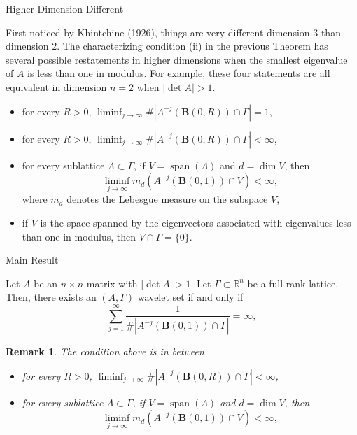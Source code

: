 \documentclass{sintefbeamer}
\newcommand{\R}{{\mathbb {R}}}
\newtheorem{remark}{Remark}
\begin{document}
\begin{frame}{Higher Dimension Different}

   First noticed by Khintchine (1926), things are very different dimension 3 than dimension 2. The characterizing condition (ii) in the previous Theorem has several possible restatements in higher dimensions when the smallest eigenvalue of $A$ is less than one in modulus. For example, these four statements are all equivalent in dimension $n=2$ when $\left|\det A\right|>1$.
   
    \begin{itemize}
\item for every $R > 0$, $\liminf_{j \to \infty} \# | A^{-j}(\mathbf B(0,R)) \cap \Gamma | = 1$,
\pause \item for every $R > 0$, $\liminf_{j \to \infty} \# |A^{-j}(\mathbf B(0,R)) \cap \Gamma |< \infty$,
\pause \item for every sublattice $\Lambda\subset \Gamma$, if $V = {\operatorname{span}}(\Lambda)$ and $d=\dim V$, then
\[
\liminf_{j\to \infty} m_d(A^{-j}(\mathbf B(0,1)) \cap V) <\infty,
\]
where $m_d$ denotes the Lebesgue measure on the subspace $V$,
\pause \item if $V$ is the space spanned by the eigenvectors associated with eigenvalues less than one in modulus, then $V \cap \Gamma = \{0\}$.
        \end{itemize}  
\end{frame}

\begin{frame}{Main Result}

\begin{theorem}
    Let $A$ be an $n\times n$ matrix with $\left |\det A \right|>1$. Let $\Gamma \subset \R^n$ be a full rank lattice.
Then, there exists an $(A,\Gamma)$ wavelet set if and only if 
\begin{equation*}
\sum_{j=1}^\infty \frac{1}{\# \left|A^{-j}(\mathbf B(0,1)) \cap \Gamma \right |} =\infty,
\end{equation*}
\end{theorem}

\pause
\begin{remark}
    The condition above is in between 
    \begin{itemize}
\item for every $R > 0$, $\liminf_{j \to \infty} \# |A^{-j}(\mathbf B(0,R)) \cap \Gamma |< \infty$,
\item for every sublattice $\Lambda\subset \Gamma$, if $V = {\operatorname{span}}(\Lambda)$ and $d=\dim V$, then
\[
\liminf_{j\to \infty} m_d(A^{-j}(\mathbf B(0,1)) \cap V) <\infty,
\]
    \end{itemize}
\end{remark}
\end{frame}
\end{document}
